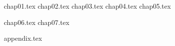 \documentclass[
]{ctexbook}
\begin{document}


% 
% 

\setcounter{secnumdepth}{4}
\setcounter{tocdepth}{4}
\tableofcontents
% 


% 
% 

% 
% 
% 

{chap01.tex}
{chap02.tex}
{chap03.tex}
{chap04.tex}
{chap05.tex}


{chap06.tex}
{chap07.tex}

{appendix.tex}
\end{document}
